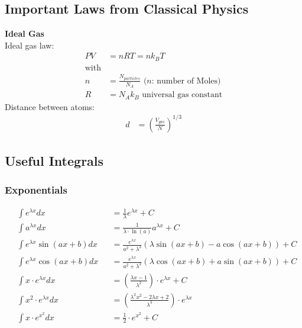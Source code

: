 \subsection{Important Laws from Classical Physics}
\textbf{Ideal Gas}\\
Ideal gas law:
\noindent\begin{align*}
    PV & =nRT=n k_B T                                              \\
    \text{with}                                                    \\
    n  & =\frac{N_{particles}}{N_A} \text{ ($n$: number of Moles)} \\
    R  & =N_A k_B \text{ universal gas constant}
\end{align*}
Distance between atoms:
\noindent\begin{align*}
    d & ={\left(\frac{V_{gas}}{N}\right)}^{1/3}
\end{align*}

\subsection{Useful Integrals}
\subsubsection{Exponentials}
\begin{footnotesize}
    \noindent\begin{align*}
         & \int e^{\lambda x}dx           &  & =\frac{1}{\lambda }e^{\lambda x}+C                                                 \\
         & \int a^{\lambda x}dx           &  & =\frac{1}{\lambda \cdot \ln(a)}a^{\lambda x}+C                                     \\
         & \int e^{\lambda x}\sin(ax+b)dx &  & =\frac{e^{\lambda x}}{a^2+\lambda ^2}\left(\lambda \sin(ax+b)-a\cos(ax+b)\right)+C \\
         & \int e^{\lambda x}\cos(ax+b)dx &  & =\frac{e^{\lambda x}}{a^2+\lambda ^2}\left(\lambda \cos(ax+b)+a\sin(ax+b)\right)+C \\
         & \int x \cdot e^{\lambda x}dx   &  & =(\frac{\lambda x-1}{\lambda ^2})\cdot e^{\lambda x}+C                             \\
         & \int x^2 \cdot e^{\lambda x}dx &  & =(\frac{\lambda ^2x^2-2\lambda x+2}{\lambda ^3})\cdot e^{\lambda x}                \\
         & \int x\cdot e^{x^2}dx          &  & =\frac{1}{2}\cdot e^{x^2}+C
    \end{align*}
\end{footnotesize}

